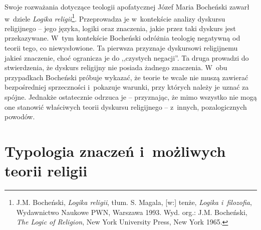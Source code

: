 Swoje rozważania dotyczące teologii apofatycznej Józef Maria Bocheński zawarł w~dziele \textit{Logika religii}\footnote{J.M. Bocheński, \textit{Logika religii}, tłum. S. Magala, [w:] tenże, \textit{Logika i~filozofia}, Wydawnictwo Naukowe PWN, Warszawa 1993. Wyd. org.: J.M. Bocheński, \textit{The Logic of Religion}, New York University Press, New York 1965.}. Przeprowadza je w~kontekście analizy dyskursu religijnego -- jego języka, logiki oraz znaczenia, jakie przez taki dyskurs jest przekazywane. W~tym kontekście Bocheński odróżnia teologię negatywną od teorii tego, co niewysłowione. Ta pierwsza przyznaje dyskursowi religijnemu jakieś znaczenie, choć ogranicza je do ,,czystych negacji''. Ta druga prowadzi do stwierdzenia, że dyskurs religijny nie posiada żadnego znaczenia. W~obu przypadkach Bocheński próbuje wykazać, że teorie te wcale nie muszą zawierać bezpośredniej sprzeczności i~pokazuje warunki, przy których należy je uznać za spójne. Jednakże ostatecznie odrzuca je -- przyznając, że mimo wszystko nie mogą one stanowić właściwych teorii dyskursu religijnego -- z~innych, pozalogicznych powodów.


\section{Typologia znaczeń i~możliwych teorii religii}\label{sil-boch-znaczteol}

